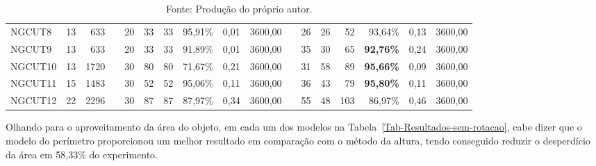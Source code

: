 \documentclass[10pt, a4paper]{article}
\begin{document}
\begin{table}[H]
{\begin{tabular}{l *{16}{r}}
                    NGCUT8  & 13 &  633     && 20 & 33 & 33 &          95,91\% & 0,01 & 3600,00    && 26 & 26 &  52 &          93,64\% & 0,13 & 3600,00    \\
                    NGCUT9  & 13 &  633     && 20 & 33 & 33 &          91,89\% & 0,01 & 3600,00    && 35 & 30 &  65 & \textbf{92,76\%} & 0,24 & 3600,00    \\
                    NGCUT10 & 13 & 1720     && 30 & 80 & 80 &          71,67\% & 0,21 & 3600,00    && 31 & 58 &  89 & \textbf{95,66\%} & 0,09 & 3600,00    \\
                    NGCUT11 & 15 & 1483     && 30 & 52 & 52 &          95,06\% & 0,11 & 3600,00    && 36 & 43 &  79 & \textbf{95,80\%} & 0,11 & 3600,00    \\
                    NGCUT12 & 22 & 2296     && 30 & 87 & 87 &          87,97\% & 0,34 & 3600,00    && 55 & 48 & 103 &          86,97\% & 0,46 & 3600,00    \\
                    \bottomrule
                \end{tabular}
            }
            \caption*{Fonte: Produção do próprio autor.}    %
        \end{table}
    
        Olhando para o aproveitamento da área do objeto, em cada um dos modelos na Tabela~\ref{Tab-Resultados-sem-rotacao}, cabe dizer que o modelo do perímetro proporcionou um melhor resultado em comparação com o método da altura, tendo conseguido reduzir o desperdício da área em 58,33\% do experimento.
    
\end{document}
